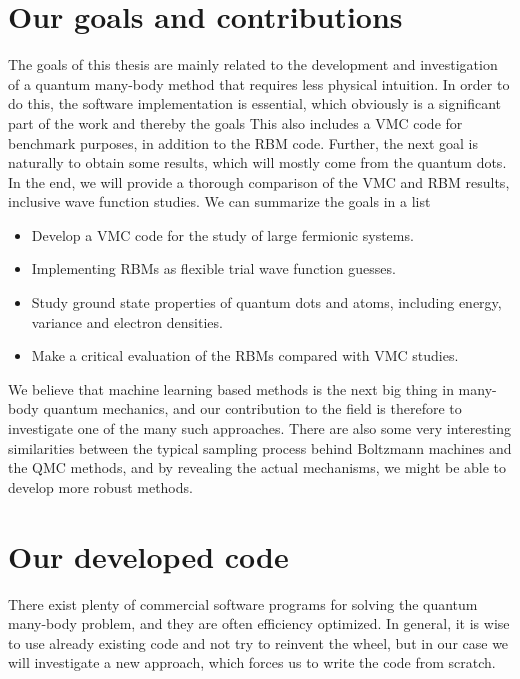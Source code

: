\section{Our goals and contributions} \label{sec:goals}
The goals of this thesis are mainly related to the development and investigation of a quantum many-body method that requires less physical intuition. In order to do this, the software implementation is essential, which obviously is a significant part of the work and thereby the goals This also includes a VMC code for benchmark purposes, in addition to the RBM code. Further, the next goal is naturally to obtain some results, which will mostly come from the quantum dots. In the end, we will provide a thorough comparison of the VMC and RBM results, inclusive wave function studies. We can summarize the goals in a list
\begin{itemize}
	\item Develop a VMC code for the study of large fermionic systems.
	\item Implementing RBMs as flexible trial wave function guesses.
	\item Study ground state properties of quantum dots and atoms, including energy, variance and electron densities.
	\item Make a critical evaluation of the RBMs compared with VMC studies.
\end{itemize}

We believe that machine learning based methods is the next big thing in many-body quantum mechanics, and our contribution to the field is therefore to investigate one of the many such approaches. There are also some very interesting similarities between the typical sampling process behind Boltzmann machines and the QMC methods, and by revealing the actual mechanisms, we might be able to develop more robust methods. 

\section{Our developed code}
There exist plenty of commercial software programs for solving the quantum many-body problem, and they are often efficiency optimized. In general, it is wise to use already existing code and not try to reinvent the wheel, but in our case we will investigate a new approach, which forces us to write the code from scratch. 

